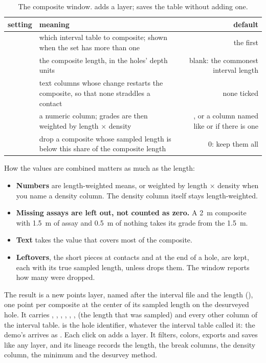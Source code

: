 \begin{table}[htbp]
\small
\begin{tabularx}{\linewidth}{@{}lMD@{}}\toprule
setting & meaning & default \\ \midrule
{} & which interval table to composite; shown when the set has more than one & the first \\
 & the composite length, in the holes' depth units & blank: the commonest interval length \\
 & text columns whose change restarts the composite, so that none straddles a contact & none ticked \\
 & a numeric column; grades are then weighted by length × density & , or a column named like  or  if there is one \\
 & drop a composite whose sampled length is below this share of the composite length & 0: keep them all \\
\bottomrule
\end{tabularx}
\caption{The composite window.  adds a layer;  saves the table without adding one.}\label{tab:dh-composite}
\end{table}


How the values are combined matters as much as the length:

\begin{itemize}
\item \textbf{Numbers} are length-weighted means, or weighted by length × density when you name a density column. The density column itself stays length-weighted.
\item \textbf{Missing assays are left out, not counted as zero.} A 2~m composite with 1.5~m of assay and 0.5~m of nothing takes its grade from the 1.5~m.
\item \textbf{Text} takes the value that covers most of the composite.
\item \textbf{Leftovers}, the short pieces at contacts and at the end of a hole, are kept, each with its true sampled length, unless  drops them. The window reports how many were dropped.
\end{itemize}

The result is a new points layer, named after the interval file and the length (), one point per composite at the center of its sampled length on the desurveyed hole. It carries , , , , , ,  (the length that was sampled) and every other column of the interval table.  is the hole identifier, whatever the interval table called it: the demo's  arrives as . Each click on  adds a layer. It filters, colors, exports and saves like any layer, and its lineage records the length, the break columns, the density column, the minimum and the desurvey method.

